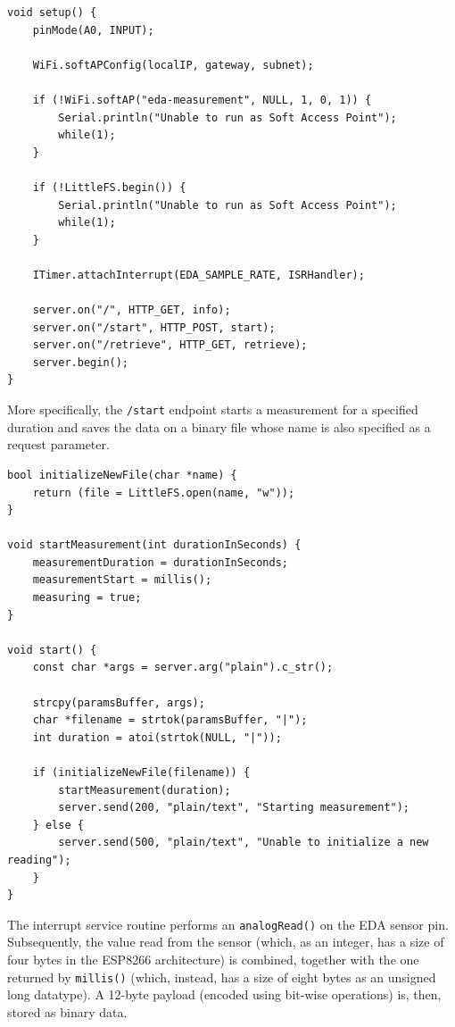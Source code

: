 \begin{verbatim}
void setup() {
    pinMode(A0, INPUT);

    WiFi.softAPConfig(localIP, gateway, subnet);
    
    if (!WiFi.softAP("eda-measurement", NULL, 1, 0, 1)) {
        Serial.println("Unable to run as Soft Access Point");
        while(1);
    }

    if (!LittleFS.begin()) {
        Serial.println("Unable to run as Soft Access Point");
        while(1);
    }

    ITimer.attachInterrupt(EDA_SAMPLE_RATE, ISRHandler);

    server.on("/", HTTP_GET, info);
    server.on("/start", HTTP_POST, start);
    server.on("/retrieve", HTTP_GET, retrieve);
    server.begin();
}
\end{verbatim}

More specifically, the \texttt{/start} endpoint starts a measurement for a specified duration and saves the data on a binary file whose name is also specified as a request parameter.

\begin{verbatim}
bool initializeNewFile(char *name) {
    return (file = LittleFS.open(name, "w"));
}

void startMeasurement(int durationInSeconds) {
    measurementDuration = durationInSeconds;
    measurementStart = millis();
    measuring = true;
}

void start() {
    const char *args = server.arg("plain").c_str();

    strcpy(paramsBuffer, args);
    char *filename = strtok(paramsBuffer, "|");
    int duration = atoi(strtok(NULL, "|"));

    if (initializeNewFile(filename)) {
        startMeasurement(duration);
        server.send(200, "plain/text", "Starting measurement");
    } else {
        server.send(500, "plain/text", "Unable to initialize a new reading");
    }
}
\end{verbatim}

The interrupt service routine performs an \texttt{analogRead()} on the EDA sensor pin. Subsequently, the value read from the sensor (which, as an integer, has a size of four bytes in the ESP8266 architecture) is combined, together with the one returned by \texttt{millis()} (which, instead, has a size of eight bytes as an unsigned long datatype). A 12-byte payload (encoded using bit-wise operations) is, then, stored as binary data.

